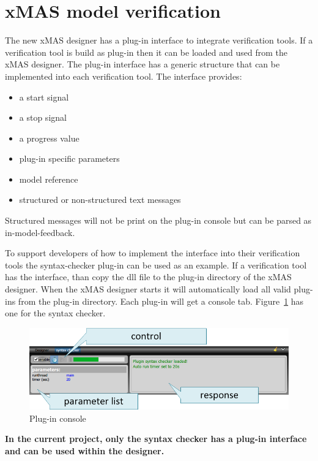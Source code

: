 \section{xMAS model verification}

The new xMAS designer has a plug-in interface to integrate verification tools.
If a verification tool is build as plug-in then it can be loaded and used from
the xMAS designer. The plug-in interface has a generic structure that can be
implemented into each verification tool. The interface provides:
\begin{itemize}
\item a start signal
\item a stop signal
\item a progress value
\item plug-in specific parameters
\item model reference
\item structured or non-structured text messages
\end{itemize}

Structured messages will not be print on the plug-in console but can be parsed as
in-model-feedback.

To support developers of how to implement the interface into their verification
tools the syntax-checker plug-in can be used as an example. If a verification
tool has the interface, than copy the dll file to the plug-in directory of the
xMAS designer. When the xMAS designer starts it will automatically load all valid
plug-ins from the plug-in directory. Each plug-in will get a console tab.
Figure~\ref{fig:plug-in-console} has one for the syntax checker.

\begin{figure}[here]
\begin{center}	
	\includegraphics[width=.70\linewidth]{pictures/plug-in-console}
	\caption{Plug-in console}
	\label{fig:plug-in-console}
\end{center}
\end{figure}

\begin{tcolorbox}[colback=white]
\textbf{
In the current project, only the syntax checker has a plug-in interface and can
be used within the designer.
}
\end{tcolorbox}

